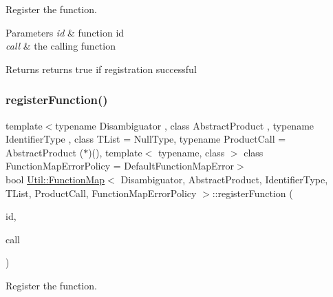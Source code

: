 Register the function. 


\begin{DoxyParams}{Parameters}
{\em id} & function id \\
\hline
{\em call} & the calling function \\
\hline
\end{DoxyParams}
\begin{DoxyReturn}{Returns}
returns true if registration successful 
\end{DoxyReturn}
\mbox{\label{classUtil_1_1FunctionMap_a9668b22d7c1d46b48b069dfec3301aa4}} 
\subsubsection{\texorpdfstring{registerFunction()}{registerFunction()}\hspace{0.1cm}{\footnotesize\ttfamily [2/3]}}
{\footnotesize\ttfamily template$<$typename Disambiguator , class Abstract\+Product , typename Identifier\+Type , class T\+List  = Null\+Type, typename Product\+Call  = Abstract\+Product ($\ast$)(), template$<$ typename, class $>$ class Function\+Map\+Error\+Policy = Default\+Function\+Map\+Error$>$ \\
bool \mbox{\hyperlink{classUtil_1_1FunctionMap}{Util\+::\+Function\+Map}}$<$ Disambiguator, Abstract\+Product, Identifier\+Type, T\+List, Product\+Call, Function\+Map\+Error\+Policy $>$\+::register\+Function (\begin{DoxyParamCaption}\item[{const Identifier\+Type \&}]{id,  }\item[{Product\+Call}]{call }\end{DoxyParamCaption})\hspace{0.3cm}{\ttfamily [inline]}}



Register the function. 


